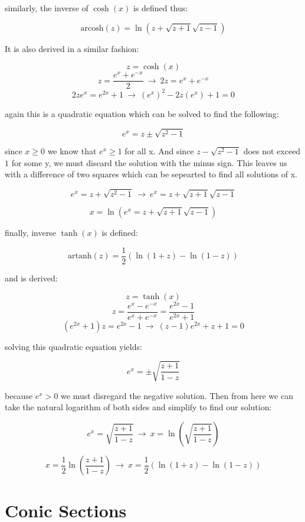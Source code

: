 \documentclass{article}
\begin{document}
\noindent similarly, the inverse of \(\cosh\left(x\right)\) is defined thus:

\[\textrm{arcosh}\left(z\right)=\ln\left(z+\sqrt{z+1}\sqrt{z-1}\right)\]

\noindent It is also derived in a similar fashion:

\[z=\cosh\left(x\right)\]
\[z=\frac{e^x+e^{-x}}{2} \: \rightarrow \: 2z=e^x+e^{-x}\]
\[2ze^x=e^{2x}+1 \: \rightarrow \: \left(e^x\right)^2-2z\left(e^x\right)+1=0\]

\noindent again this is a quadratic equation which can be solved to find the following:

\[e^x=z\pm\sqrt{z^2-1}\]

\noindent since \(x\geq0\) we know that \(e^x\geq1\) for all \textrm{x}. And since \(z-\sqrt{z^2-1}\) does not exceed \(1\) for some \textrm{y}, we must discard the solution with the minus sign. This leaves us with a difference of two squares which can be sepearted to find all solutions of \textrm{x}.

\[e^x=z+\sqrt{z^2-1} \: \rightarrow \: e^x=z+\sqrt{z+1}\sqrt{z-1}\]

\[x=\ln\left(e^x=z+\sqrt{z+1}\sqrt{z-1}\right)\]

\noindent finally, inverse \(\tanh\left(x\right)\) is defined:

\[\textrm{artanh}\left(z\right)=\frac{1}{2}\left(\ln\left(1+z\right)-\ln\left(1-z\right)\right)\]

\noindent and is derived:

\[z=\tanh\left(x\right)\]
\[z=\frac{e^x-e^{-x}}{e^x+e^{-x}}=\frac{e^{2x}-1}{e^{2x}+1}\]
\[\left(e^{2x}+1\right)z=e^{2x}-1 \: \rightarrow \: \left(z-1\right)e^{2x}+z+1=0\]

\noindent solving this quadratic equation yields:

\[e^x=\pm\sqrt{\frac{z+1}{1-z}}\]

\noindent because \(e^x>0\) we must disregard the negative solution. Then from here we can take the natural logarithm of both sides and simplify to find our solution:

\[e^x=\sqrt{\frac{z+1}{1-z}} \: \rightarrow \: x=\ln\left(\sqrt{\frac{z+1}{1-z}}\right)\]

\[x=\frac{1}{2}\ln\left(\frac{z+1}{1-z}\right) \: \rightarrow \: x=\frac{1}{2}\left(\ln\left(1+z\right)-\ln\left(1-z\right)\right)\]


\section{Conic Sections}
\end{document}
